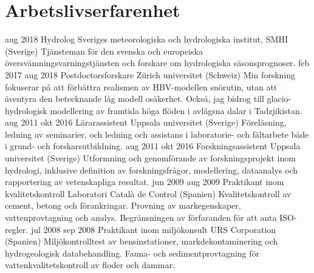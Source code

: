\ifswedish
  \section{Arbetslivserfarenhet}
    \position
      {aug 2018 \textemdash{} }
      {Hydrolog}
      {Sveriges meteorologiska och hydrologiska institut, SMHI (Sverige)}
      {Tjänsteman för den svenska och europeiska översvämningsvarningstjänsten och forskare om hydrologiska säsonsprognoser.}
    \position
      {feb 2017 \textemdash{} aug 2018}
      {Postdoctorsforskare}
      {Zürich universitet (Schweiz)}
      {Min forskning fokuserar på att förbättra realismen av HBV-modellen snörutin, utan att äventyra den betecknande låg modell osäkerhet. Också, jag bidrog till glacio-hydrologisk modellering av framtida höga flöden i avlägsna dalar i Tadzjikistan.}
    \position
      {aug 2011 \textemdash{} okt 2016}
      {Lärarassistent}
      {Uppsala universitet (Sverige)}
      {Föreläsning, ledning av seminarier, och ledning och assistans i laboratorie- och fältarbete både i grund- och forskarsutbildning.}
    \position
      {aug 2011 \textemdash{} okt 2016}
      {Forskningsassistent}
      {Uppsala universitet (Sverige)}
      {Utformning och genomförande av forskningsprojekt inom hydrologi, inklusive definition av forskningsfrågor, modellering, dataanalys och rapportering av vetenskapliga resultat.}
    \position
      {jun 2009 \textemdash{} aug 2009}
      {Praktikant inom kvalitetskontroll}
      {Laboratori Català de Control (Spanien)}
      {Kvalitetskontroll av cement, betong och förankringar. Provning av markegenskaper, vattenprovtagning och analys. Begränsningen av förfaranden för att anta ISO-regler.}
    \position
      {jul 2008 \textemdash{} sep 2008}
      {Praktikant inom miljökonsult}
      {URS Corporation (Spanien)}
      {Miljökontrolltest av bensinstationer, markdekontaminering och hydrogeologisk databehandling. Fauna- och sedimentprovtagning för vattenkvalitetskontroll av floder och dammar.}
\else
